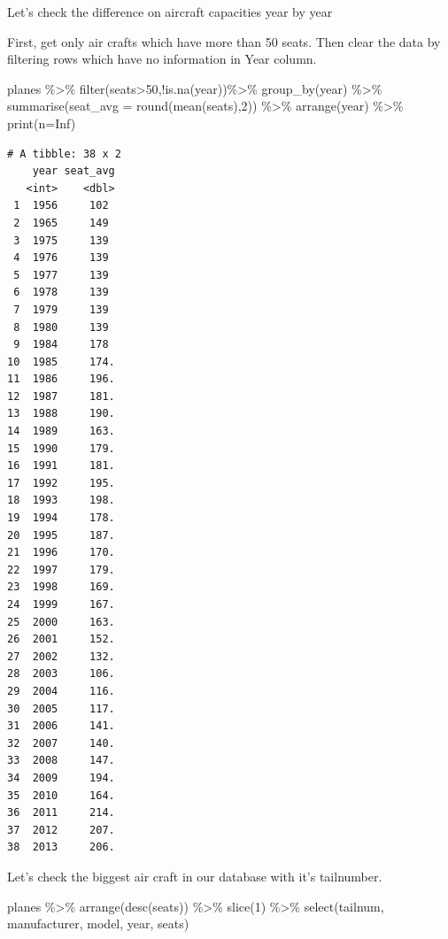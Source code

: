 \documentclass[
  letterpaper,
  DIV=11,
  numbers=noendperiod]{scrreprt}
\newenvironment{Shaded}{\begin{snugshade}}{\end{snugshade}}
\newcommand{\AttributeTok}[1]{\textcolor[rgb]{0.40,0.45,0.13}{#1}}
\newcommand{\ConstantTok}[1]{\textcolor[rgb]{0.56,0.35,0.01}{#1}}
\newcommand{\DecValTok}[1]{\textcolor[rgb]{0.68,0.00,0.00}{#1}}
\newcommand{\FunctionTok}[1]{\textcolor[rgb]{0.28,0.35,0.67}{#1}}
\newcommand{\NormalTok}[1]{\textcolor[rgb]{0.00,0.23,0.31}{#1}}
\newcommand{\SpecialCharTok}[1]{\textcolor[rgb]{0.37,0.37,0.37}{#1}}
\begin{document}
Let's check the difference on aircraft capacities year by year

First, get only air crafts which have more than 50 seats. Then clear the
data by filtering rows which have no information in Year column.

\begin{Shaded}
\begin{Highlighting}[]
\NormalTok{planes }\SpecialCharTok{\%\textgreater{}\%} 
  \FunctionTok{filter}\NormalTok{(seats}\SpecialCharTok{\textgreater{}}\DecValTok{50}\NormalTok{,}\SpecialCharTok{!}\FunctionTok{is.na}\NormalTok{(year))}\SpecialCharTok{\%\textgreater{}\%}
  \FunctionTok{group\_by}\NormalTok{(year) }\SpecialCharTok{\%\textgreater{}\%} 
  \FunctionTok{summarise}\NormalTok{(}\AttributeTok{seat\_avg =} \FunctionTok{round}\NormalTok{(}\FunctionTok{mean}\NormalTok{(seats),}\DecValTok{2}\NormalTok{)) }\SpecialCharTok{\%\textgreater{}\%} 
  \FunctionTok{arrange}\NormalTok{(year) }\SpecialCharTok{\%\textgreater{}\%} 
  \FunctionTok{print}\NormalTok{(}\AttributeTok{n=}\ConstantTok{Inf}\NormalTok{)}
\end{Highlighting}
\end{Shaded}

\begin{verbatim}
# A tibble: 38 x 2
    year seat_avg
   <int>    <dbl>
 1  1956     102 
 2  1965     149 
 3  1975     139 
 4  1976     139 
 5  1977     139 
 6  1978     139 
 7  1979     139 
 8  1980     139 
 9  1984     178 
10  1985     174.
11  1986     196.
12  1987     181.
13  1988     190.
14  1989     163.
15  1990     179.
16  1991     181.
17  1992     195.
18  1993     198.
19  1994     178.
20  1995     187.
21  1996     170.
22  1997     179.
23  1998     169.
24  1999     167.
25  2000     163.
26  2001     152.
27  2002     132.
28  2003     106.
29  2004     116.
30  2005     117.
31  2006     141.
32  2007     140.
33  2008     147.
34  2009     194.
35  2010     164.
36  2011     214.
37  2012     207.
38  2013     206.
\end{verbatim}

Let's check the biggest air craft in our database with it's tailnumber.

\begin{Shaded}
\begin{Highlighting}[]
\NormalTok{planes }\SpecialCharTok{\%\textgreater{}\%}
  \FunctionTok{arrange}\NormalTok{(}\FunctionTok{desc}\NormalTok{(seats)) }\SpecialCharTok{\%\textgreater{}\%} 
  \FunctionTok{slice}\NormalTok{(}\DecValTok{1}\NormalTok{) }\SpecialCharTok{\%\textgreater{}\%}
  \FunctionTok{select}\NormalTok{(tailnum, manufacturer, model, year, seats)}
\end{Highlighting}
\end{Shaded}
\end{document}
